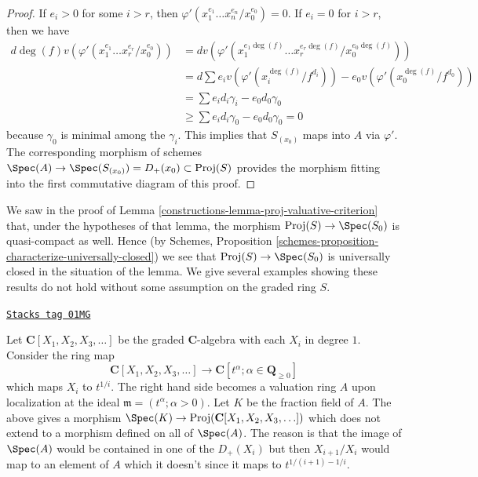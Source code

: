 \begin{proof}
If $e_i > 0$ for some $i > r$, then
$\varphi'(x_1^{e_1} \ldots x_n^{e_n}/x_0^{e_0}) = 0$.
If $e_i = 0$ for $i > r$, then we have
\begin{align*}
d \deg(f) v(\varphi'(x_1^{e_1} \ldots x_r^{e_r}/x_0^{e_0}))
& =
d v(\varphi'(x_1^{e_1 \deg(f)} \ldots x_r^{e_r \deg(f)}/x_0^{e_0 \deg(f)})) \\
& =
d \sum e_i v(\varphi'(x_i^{\deg(f)}/f^{d_i}))
- e_0 v(\varphi'(x_0^{\deg(f)}/f^{d_0})) \\
& =
\sum e_i d_i \gamma_i - e_0 d_0 \gamma_0 \\
& \geq
\sum e_i d_i \gamma_0 - e_0 d_0 \gamma_0 = 0
\end{align*}
because $\gamma_0$ is minimal among the $\gamma_i$.
This implies that $S_{(x_0)}$ maps into $A$ via $\varphi'$.
The corresponding morphism of schemes
$\Spec(A) \to \Spec(S_{(x_0)}) = D_{+}(x_0)
\subset \text{Proj}(S)$ provides the morphism fitting into
the first commutative diagram of this proof.
\end{proof}

We saw in the proof of Lemma \ref{constructions-lemma-proj-valuative-criterion}
that, under the hypotheses of that lemma, the morphism
$\text{Proj}(S) \to \Spec(S_0)$ is quasi-compact as well. Hence (by
Schemes, Proposition \ref{schemes-proposition-characterize-universally-closed})
we see that $\text{Proj}(S) \to \Spec(S_0)$ is universally closed in
the situation of the lemma. We give several examples showing these results
do not hold without some assumption on the graded ring $S$.

\begin{example}
\label{constructions-example-not-existence-valuative-big-proj}
\href{https://stacks.math.columbia.edu/tag/01MG}{\texttt{Stacks tag 01MG}}

Let $\mathbf{C}[X_1, X_2, X_3, \ldots]$ be the graded $\mathbf{C}$-algebra
with each $X_i$ in degree $1$. Consider the ring map
$$
\mathbf{C}[X_1, X_2, X_3, \ldots]
\longrightarrow
\mathbf{C}[t^\alpha ; \alpha \in \mathbf{Q}_{\geq 0}]
$$
which maps $X_i$ to $t^{1/i}$. The right hand side becomes a valuation ring
$A$ upon localization at the ideal $\mathfrak m = (t^\alpha ; \alpha > 0)$.
Let $K$ be the fraction field of $A$. The above gives a morphism
$\Spec(K) \to \text{Proj}(\mathbf{C}[X_1, X_2, X_3, \ldots])$ which does not
extend to a morphism defined on all of $\Spec(A)$.
The reason is that the image of $\Spec(A)$ would be contained
in one of the $D_{+}(X_i)$ but then $X_{i + 1}/X_i$ would map
to an element of $A$ which it doesn't since it maps to
$t^{1/(i + 1) - 1/i}$.
\end{example}

